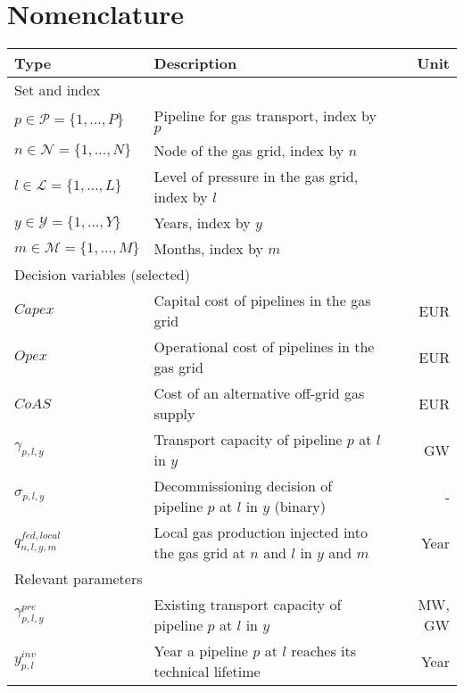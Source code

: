 \documentclass[review]{elsarticle}
\begin{document}
\section*{Nomenclature}
\begin{center}
	\renewcommand{\arraystretch}{1.0}
	\centering
	\small
	\begin{tabular}{lm{8cm}r}
		Type & Description & Unit\\
		\hline
		Set and index & & \\
		\hline
		{$p \in \mathcal{P}=\{1,\ldots,P\}$} & Pipeline for gas transport, index by $p$\\
		{$n \in \mathcal{N}=\{1,\ldots,N\}$} & Node of the gas grid, index by $n$\\
		{$l \in \mathcal{L}=\{1,\ldots,L\}$} & Level of pressure in the gas grid, index by $l$\\
		{$y \in \mathcal{Y}=\{1,\ldots,Y\}$} & Years, index by $y$\\
		{$m \in \mathcal{M}=\{1,\ldots,M\}$} & Months, index by $m$\\
		\hline
		\multicolumn{2}{l}{Decision variables (selected)}\\
		\hline
		{$Capex$} & Capital cost of pipelines in the gas grid & \SI{}{EUR}\\
		{$Opex$} & Operational cost of pipelines in the gas grid & \SI{}{EUR}\\
		{$CoAS$} & Cost of an alternative off-grid gas supply & \SI{}{EUR}\\
		{$\gamma_{p,l,y}$} & Transport capacity of pipeline $p$ at $l$ in $y$& \SI{}{GW}\\
		{$\sigma_{p,l,y}$} & Decommissioning decision of pipeline $p$ at $l$ in $y$ (binary)& -\\
		{$q^{fed, local}_{n, l, y, m}$} & Local gas production injected into the gas grid at $n$ and $l$ in $y$ and $m$& \SI{}{Year}\\
		\hline
		\multicolumn{2}{l}{Relevant parameters}\\
		\hline
		{$\gamma^{pre}_{p,l,y}$} & Existing transport capacity of pipeline $p$ at $l$ in $y$ & \SI{}{MW}, \SI{}{GW}\\
		{$y^{inv}_{p,l}$} & Year a pipeline $p$ at $l$ reaches its technical lifetime & \SI{}{Year}\\
		
		\hline
	\end{tabular}
\end{center}
\newpage



\newpage

\newpage

\newpage


\newpage
\end{document}
